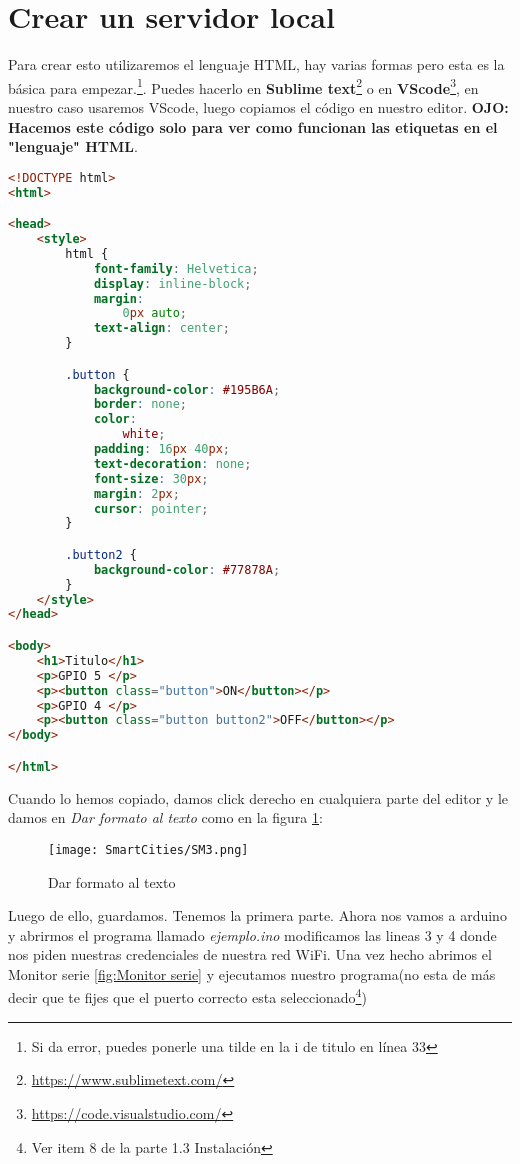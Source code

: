 \documentclass[
	12pt, %
	fleqn, %
	a4paper, %
	oneside, %
]{LegrandOrangeBook}
\begin{document}
\section{Crear un servidor local}
Para crear esto utilizaremos el lenguaje HTML, hay varias formas pero esta es la básica para empezar.\footnote{Si da error, puedes ponerle una tilde en la i de titulo en línea 33}. Puedes hacerlo en \textbf{Sublime text}\footnote{\url{https://www.sublimetext.com/}} o en \textbf{VScode}\footnote{\url{https://code.visualstudio.com/}}, en nuestro caso usaremos VScode, luego copiamos el código en nuestro editor. \textbf{OJO: Hacemos este código solo para ver como funcionan las etiquetas en el "lenguaje" HTML}.
\begin{lstlisting}[language=html, caption={Conectarse a una red WiFi},captionpos=b,frame=single]
<!DOCTYPE html>
<html>

<head>
    <style>
        html {
            font-family: Helvetica;
            display: inline-block;
            margin:
                0px auto;
            text-align: center;
        }

        .button {
            background-color: #195B6A;
            border: none;
            color:
                white;
            padding: 16px 40px;
            text-decoration: none;
            font-size: 30px;
            margin: 2px;
            cursor: pointer;
        }

        .button2 {
            background-color: #77878A;
        }
    </style>
</head>

<body>
    <h1>Titulo</h1>
    <p>GPIO 5 </p>
    <p><button class="button">ON</button></p>
    <p>GPIO 4 </p>
    <p><button class="button button2">OFF</button></p>
</body>

</html>
\end{lstlisting}
Cuando lo hemos copiado, damos click derecho en cualquiera parte del editor y le damos en \textit{Dar formato al texto} como en la figura \ref{fig:VSformato}:
\begin{figure}[h]
\centering\texttt{[image: SmartCities/SM3.png]}
\caption{Dar formato al texto}
\label{fig:VSformato}
\end{figure}
Luego de ello, guardamos. Tenemos la primera parte.
Ahora nos vamos a arduino y abrirmos el programa llamado \textit{ejemplo.ino} modificamos las lineas 3 y 4 donde nos piden nuestras credenciales de nuestra red WiFi. Una vez hecho abrimos el Monitor serie \ref{fig:Monitor serie} y ejecutamos nuestro programa(no esta de más decir que te fijes que el puerto correcto esta seleccionado\footnote{Ver item 8 de la parte 1.3 Instalación})\\
\end{document}
